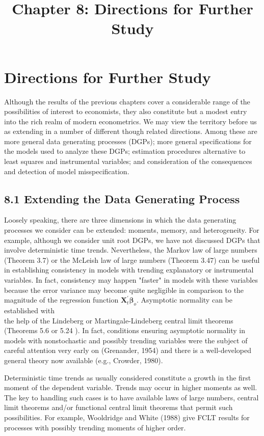 \documentclass[10pt]{article}
\title{Chapter 8: Directions for Further Study}
\author{}
\date{}
\begin{document}
\maketitle


\section*{Directions for Further Study}
Although the results of the previous chapters cover a considerable range of the possibilities of interest to economists, they also constitute but a modest entry into the rich realm of modern econometrics. We may view the territory before us as extending in a number of different though related directions. Among these are more general data generating processes (DGPs); more general specifications for the models used to analyze these DGPs; estimation procedures alternative to least squares and instrumental variables; and consideration of the consequences and detection of model misspecification.

\subsection*{8.1 Extending the Data Generating Process}
Loosely speaking, there are three dimensions in which the data generating processes we consider can be extended: moments, memory, and heterogeneity. For example, although we consider unit root DGPs, we have not discussed DGPs that involve deterministic time trends. Nevertheless, the Markov law of large numbers (Theorem 3.7) or the McLeish law of large numbers (Theorem 3.47) can be useful in establishing consistency in models with trending explanatory or instrumental variables. In fact, consistency may happen "faster" in models with these variables because the error variance may become quite negligible in comparison to the magnitude of the regression function $\mathbf{X}_{t}^{\prime} \boldsymbol{\beta}_{o}$. Asymptotic normality can be established with\\
the help of the Lindeberg or Martingale-Lindeberg central limit theorems (Theorems 5.6 or 5.24 ). In fact, conditions ensuring asymptotic normality in models with nonstochastic and possibly trending variables were the subject of careful attention very early on (Grenander, 1954) and there is a well-developed general theory now available (e.g., Crowder, 1980).

Deterministic time trends as usually considered constitute a growth in the first moment of the dependent variable. Trends may occur in higher moments as well. The key to handling such cases is to have available laws of large numbers, central limit theorems and/or functional central limit theorems that permit such possibilities. For example, Wooldridge and White (1988) give FCLT results for processes with possibly trending moments of higher order.
\end{document}
